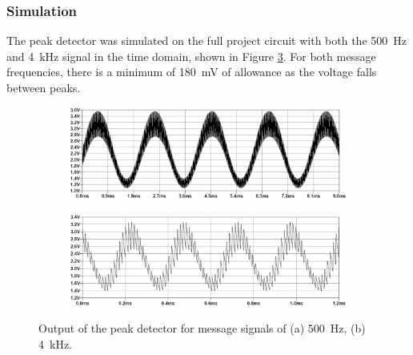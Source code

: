 \documentclass[11pt,letter,notitlepage]{article}
\begin{document}
	\subsubsection{Simulation}
	The peak detector was simulated on the full project circuit with both the \SI{500}{\Hz} and \SI{4}{\kHz} signal in the time domain, shown in Figure \ref{fig:peaks}. For both message frequencies, there is a minimum of \SI{180}{\mV} of allowance as the voltage falls between peaks.
	
	\vfil
	
	\begin{figure}[h]	
		\begin{subfigure}{\linewidth}
			\centering
			\includegraphics[width=\linewidth]{peak/peak500img}
			\caption{}
			\label{fig:peak500img}
		\end{subfigure}
		
		\vspace{2em}
		
		\begin{subfigure}{\linewidth}
			\centering
			\includegraphics[width=\linewidth]{peak/peak4kimg}
			\caption{}
			\label{fig:peak4kimg}
		\end{subfigure}
		
		\caption{Output of the peak detector for message signals of (a) \SI{500}{\Hz}, (b) \SI{4}{\kHz}.}
		\label{fig:peaks}
	\end{figure}

	\clearpage %
\end{document}
